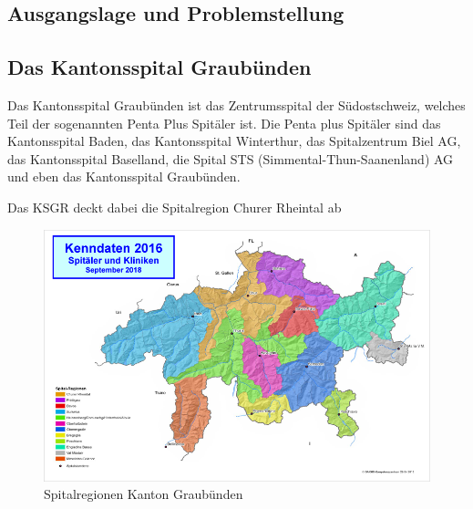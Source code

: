 
\begin{flushleft}
    \section{Ausgangslage und Problemstellung}
    \subsection{Das Kantonsspital Graubünden}
    Das Kantonsspital Graubünden ist das Zentrumsspital der Südostschweiz, welches Teil der sogenannten Penta Plus Spitäler ist.
    Die Penta plus Spitäler sind das Kantonsspital Baden, das Kantonsspital Winterthur, das Spitalzentrum Biel AG, das Kantonsspital Baselland, die Spital STS (Simmental-Thun-Saanenland) AG und eben das Kantonsspital Graubünden.
\end{flushleft}
\begin{flushleft}
    Das KSGR deckt dabei die Spitalregion Churer Rheintal ab
    \begin{figure}[H]
        \centering
        \includegraphics[width=1\linewidth]{source/introduction/initial_situation/gr_spitalregionen}
        \caption{Spitalregionen Kanton Graubünden\cite{ER2J77MB}}
        \label{fig:gr_spitalregionen}
    \end{figure}
\end{flushleft}

